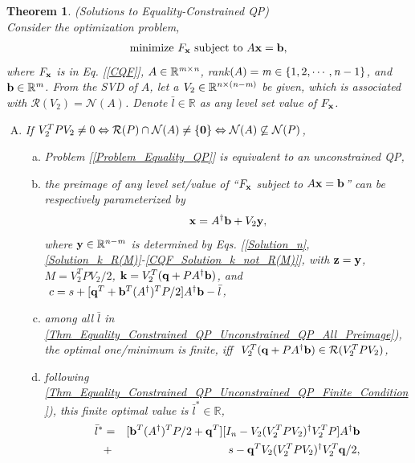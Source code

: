 \documentclass[9pt,twocolumn,twoside,lineno]{pnas-new-1}
\newcommand{\beq}{\begin{eqnarray}}
\newcommand{\eeq}{\end{eqnarray}}
\newcommand{\bfb}{{\bf b}}
\newcommand{\bfx}{{\bf x}}
\newcommand{\bfq}{{\bf q}}
\newcommand{\bfy}{{\bf y}}
\newcommand{\bfk}{{\bf k}}
\newcommand{\bfz}{{\bf z}}
\newcommand{\bfzero}{{\bf 0}}
\newcommand{\real}{\mathbb{R}}
\newcommand{\calN}{{\mathcal N}}
\newcommand{\calR}{{\mathcal R}}
\newcommand{\itm}{{\it m}}
\newcommand{\itn}{{\it n}}
\newtheorem{theorem}{Theorem}[section]
\theoremstyle{remark}
\begin{document}
\begin{theorem} (Solutions to Equality-Constrained QP)\\
Consider the optimization problem,
\beq
\mbox{minimize}~F_\bfx~\mbox{subject to}~A\bfx=\bfb,
\label{Problem_Equality_QP}
\eeq
where $F_\bfx$ is in Eq. {\rm[\ref{CQF}]}, $A\in\real^{\itm\times\itn}$, rank$(A)=\itm\in\{1,2,\cdots,\itn-1\}$, and $\bfb\in\real^\itm$. From the SVD of $A$, let a $V_2\in\real^{\itn\times(\itn-\itm)}$ be given, which is associated with $\calR(V_2)=\calN(A)$. Denote $\bar l\in\real$ as any level set value of $F_\bfx$.
\begin{enumerate}[A)]
\item\label{Thm_Equality_Constrained_QP_Condition_Unconstrained_QP} If $V_2^TPV_2\ne 0\Leftrightarrow\calR(P)\cap\calN(A)\ne\{\bfzero\}\Leftrightarrow\calN(A)\not\subseteq\calN(P)$,
    \begin{enumerate}[a)]
    \item\label{Thm_Equality_Constrained_QP_Unconstrained_QP_Qquivalence} Problem {\rm[\ref{Problem_Equality_QP}]} is equivalent to an unconstrained QP,
    \item\label{Thm_Equality_Constrained_QP_Unconstrained_QP_All_Preimage} the preimage of any level set/value of ``$F_\bfx$ subject to $A\bfx=\bfb$'' can be respectively parameterized by
        \beq
        \bfx=A^\dagger\bfb+V_2\bfy,
        \label{Parameterization_Equality_Constraint}
        \eeq
        where $\bfy\in\real^{\itn-\itm}$ is determined by Eqs. {\rm[\ref{Solution_n}}, {\rm\ref{Solution_k_R(M)}-\ref{CQF_Solution_k_not_R(M)}]}, with $\bfz=\bfy$, $M=V_2^TPV_2/2$, $\bfk=V_2^T(\bfq+PA^\dagger\bfb)$, and $~c=s+[\bfq^T+\bfb^T(A^\dagger)^TP/2]A^\dagger\bfb-\bar l$,
    \item\label{Thm_Equality_Constrained_QP_Unconstrained_QP_Finite_Condition} among all $\bar l$ in {\rm\ref{Thm_Equality_Constrained_QP_Unconstrained_QP_All_Preimage})}, the optimal one/minimum is finite, iff $~V_2^T(\bfq+PA^\dagger\bfb)\in\calR(V_2^TPV_2)$,
    \item\label{Thm_Equality_Constrained_QP_Unconstrained_QP_Optimal_Value_Optimum} following {\rm\ref{Thm_Equality_Constrained_QP_Unconstrained_QP_Finite_Condition})}, this finite optimal value is $\bar l^*\in\real$,
        \beq
        \bar l^*&=&[\bfb^T(A^\dagger)^TP/2+\bfq^T][I_\itn-V_2(V_2^TPV_2)^\dagger V_2^TP]A^\dagger\bfb\nonumber\\&+&s-\bfq^TV_2(V_2^TPV_2)^\dagger V_2^T\bfq/2,
        \label{Optimal_Value_Equality_Constrained_QP_Unconstrained_QP}
        \eeq

\end{enumerate}
\end{enumerate}
\end{theorem}
\end{document}
